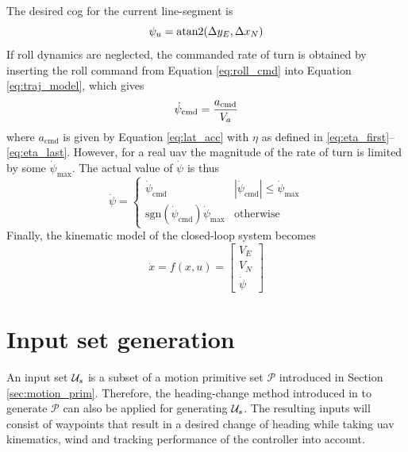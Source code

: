 The desired \ac{cog} for the current line-segment is
\begin{equation}
    \psi_u=\atan2(\Delta y_E,\Delta x_N)
\end{equation}
If roll dynamics are neglected, the commanded rate of turn is obtained by inserting the roll command from Equation \eqref{eq:roll_cmd} into Equation \eqref{eq:traj_model}, which gives 
\begin{equation}
    \dot{\psi}_{\text{cmd}}=\frac{a_{\text{cmd}}}{V_a}
\end{equation}
where $a_{\text{cmd}}$ is given by Equation \eqref{eq:lat_acc} with $\eta$ as defined in \eqref{eq:eta_first}--\eqref{eq:eta_last}.
However, for a real \ac{uav} the magnitude of the rate of turn is limited by some $\dot{\psi}_{\text{max}}$. The actual value of $\dot{\psi}$ is thus
\begin{equation}\label{eq:saturation}
    \dot{\psi}=\begin{cases}
        \dot{\psi}_{\text{cmd}} & |\dot{\psi}_{\text{cmd}}| \leq \dot{\psi}_{\text{max}} \\
        \text{sgn}(\dot{\psi}_{\text{cmd}})\dot{\psi}_{\text{max}} & \text{otherwise}
    \end{cases}
\end{equation}
Finally, the kinematic model of the closed-loop system becomes
\begin{equation}\label{eq:closed_loop}
    \dot{x}=f(x,u)=
    \begin{bmatrix}
        V_E\\
        V_N\\
        \dot{\psi}
    \end{bmatrix}
\end{equation}

\section{Input set generation}\label{sec:motion_prims_wind}
An input set $\mathcal{U}_s$ is a subset of a motion primitive set $\mathcal{P}$ introduced in Section \ref{sec:motion_prim}. Therefore, 
the heading-change method introduced in \cite{Bergman_lic} to generate $\mathcal{P}$ can also be applied for generating $\mathcal{U}_s$. The resulting inputs will consist
of waypoints that result in a desired change of heading while taking \ac{uav} kinematics, wind and tracking performance of the controller into account.

